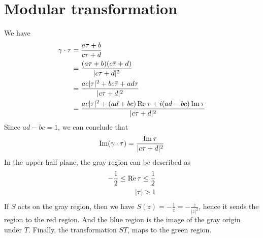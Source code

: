 \section{Modular transformation}
We have 
\[
\begin{aligned}
\gamma \cdot \tau &= \frac{a\tau + b}{c\tau + d}\\
& = \frac{(a\tau +b)(c \bar{\tau} +d)}{\lvert c \tau +d \rvert^2}\\
& = \frac{ac \lvert \tau \rvert^2 + bc \bar{\tau} + ad \tau}{\lvert c\tau + d\rvert ^2}\\
& = \frac{ac \lvert \tau \rvert ^2 + (ad+ bc)\operatorname{Re} \tau+ i(ad-bc) \operatorname{Im} \tau}{\lvert c\tau +d \rvert ^2}\\
\end{aligned}
\]
Since $ad-bc=1$, we can conclude that \[\operatorname{Im}(\gamma \cdot \tau) = \frac{\operatorname{Im} \tau}{\lvert c\tau +d\rvert^2}\]
In the upper-half plane, the gray region can be described as
\[
\begin{aligned}
-\frac{1}{2} \leq \operatorname{Re} \tau \leq \frac{1}{2}\\
\lvert \tau \rvert > 1
\end{aligned}
\]
If $S$ acts on the gray region, then we have $S(z) = -\frac{1}{z} = - \frac{\bar{z}}{\lvert z \rvert ^2}$, hence it sends the region to the red region. And the blue region is the image of the gray origin under $T$. Finally, the transformation $ST$, maps to the green region.

